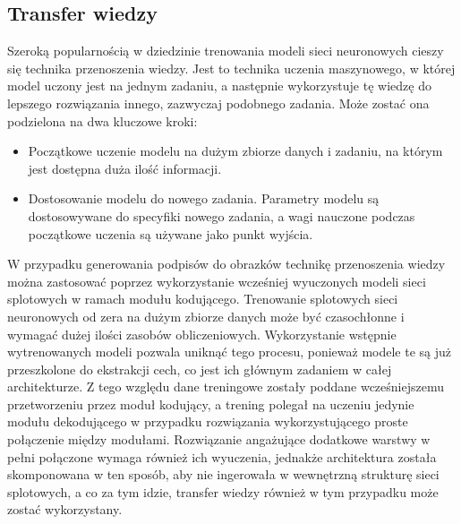 \subsection{Transfer wiedzy}
Szeroką popularnością w dziedzinie trenowania modeli sieci neuronowych cieszy się technika przenoszenia wiedzy. Jest to technika uczenia maszynowego, w której model uczony jest na jednym zadaniu, a następnie wykorzystuje tę wiedzę do lepszego rozwiązania innego, zazwyczaj podobnego zadania. Może zostać ona podzielona na dwa kluczowe kroki:
\begin{itemize}
    \item Początkowe uczenie modelu na dużym zbiorze danych i zadaniu, na którym jest dostępna duża ilość informacji.
    \item  Dostosowanie modelu do nowego zadania. Parametry modelu są dostosowywane do specyfiki nowego zadania, a wagi nauczone podczas początkowe uczenia są używane jako punkt wyjścia.
\end{itemize}
W przypadku generowania podpisów do obrazków technikę przenoszenia wiedzy można zastosować poprzez wykorzystanie wcześniej wyuczonych modeli sieci splotowych w ramach modułu kodującego. Trenowanie splotowych sieci neuronowych od zera na dużym zbiorze danych może być czasochłonne i wymagać dużej ilości zasobów obliczeniowych. Wykorzystanie wstępnie wytrenowanych modeli pozwala uniknąć tego procesu, ponieważ modele te są już przeszkolone do ekstrakcji cech, co jest ich głównym zadaniem w całej architekturze. Z tego względu dane treningowe zostały poddane wcześniejszemu przetworzeniu przez moduł kodujący, a trening polegał na uczeniu jedynie modułu dekodującego w przypadku rozwiązania wykorzystującego proste połączenie między modułami. Rozwiązanie angażujące dodatkowe warstwy w pełni połączone wymaga również ich wyuczenia, jednakże architektura została skomponowana w ten sposób, aby nie ingerowała w wewnętrzną strukturę sieci splotowych, a co za tym idzie, transfer wiedzy również w tym przypadku może zostać wykorzystany.
